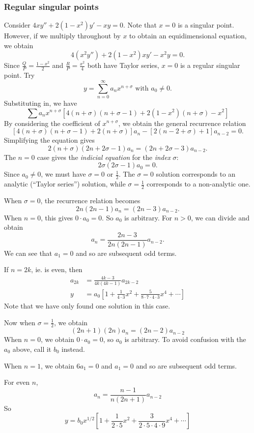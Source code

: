 \documentclass[a4paper]{article}
\begin{document}
\subsubsection*{Regular singular points}
\begin{eg}
  Consider $4xy'' + 2(1 - x^2)y' - xy = 0$. Note that $x = 0$ is a singular point. However, if we multiply throughout by $x$ to obtain an equidimensional equation, we obtain
  \[
    4(x^2 y'') + 2(1 - x^2)xy' - x^2 y = 0.
  \]
  Since $\frac{Q}{P} = \frac{1 - x^2}{2}$ and $\frac{R}{P} = \frac{x^2}{4}$ both have Taylor series, $x = 0$ is a regular singular point. Try
  \[
    y = \sum_{n = 0}^\infty a_n x^{n + \sigma}\text{ with }a_0 \not= 0.
  \]
  Substituting in, we have
  \[
    \sum a_n x^{n + \sigma}[4(n + \sigma)(n + \sigma - 1) + 2(1 - x^2)(n + \sigma) - x^2]
  \]
  By considering the coefficient of $x^{n + \sigma}$, we obtain the general recurrence relation
  \[
    [4(n + \sigma)(n + \sigma - 1) + 2(n + \sigma)]a_n -[2(n - 2 + \sigma) + 1]a_{n - 2} = 0.
  \]
  Simplifying the equation gives
  \[
    2(n + \sigma)(2n + 2\sigma - 1)a_n = (2n + 2\sigma-3)a_{n - 2}.
  \]
  The $n = 0$ case gives the \emph{indicial equation} for the \emph{index} $\sigma$:
  \[
    2\sigma(2\sigma - 1)a_0 = 0.
  \]
  Since $a_0 \not= 0$, we must have $\sigma = 0$ or $\frac{1}{2}$. The $\sigma = 0$ solution corresponds to an analytic (``Taylor series'') solution, while $\sigma = \frac{1}{2}$ corresponds to a non-analytic one.

  When $\sigma = 0$, the recurrence relation becomes
  \[
    2n(2n - 1)a_n = (2n - 3)a_{n - 2}.
  \]
  When $n = 0$, this gives $0\cdot a_0 = 0$. So $a_0$ is arbitrary. For $n >0$, we can divide and obtain
  \[
    a_n = \frac{2n - 3}{2n(2n - 1)}a_{n - 2}.
  \]
  We can see that $a_1 = 0$ and so are subsequent odd terms.

  If $n = 2k$, ie. is even, then
  \begin{align*}
    a_{2k} &= \frac{4k - 3}{4k(4k - 1)}a_{2k - 2}\\
    y &= a_0\left[1 + \frac{1}{4\cdot 3}x^2 + \frac{5}{8\cdot 7\cdot 4\cdot 3}x^4 + \cdots\right]
  \end{align*}
  Note that we have only found one solution in this case.

  Now when $\sigma = \frac{1}{2}$, we obtain
  \[
    (2n + 1)(2n)a_n = (2n - 2)a_{n - 2}
  \]
  When $n = 0$, we obtain $0\cdot a_0 = 0$, so $a_0$ is arbitrary. To avoid confusion with the $a_0$ above, call it $b_0$ instead.

  When $n = 1$, we obtain $6a_1 = 0$ and $a_1 = 0$ and so are subsequent odd terms.

  For even $n$,
  \[
    a_n = \frac{n - 1}{n(2n + 1)}a_{n - 2}
  \]
  So
  \[
    y = b_0 x^{1/2}\left[1 + \frac{1}{2\cdot 5}x^2 + \frac{3}{2\cdot 5\cdot 4\cdot 9}x^4 + \cdots\right]
  \]
\end{eg}
\end{document}
